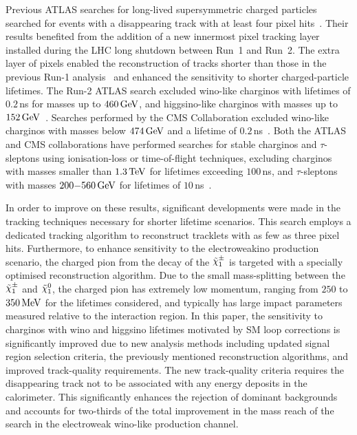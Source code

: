 Previous ATLAS searches for long-lived supersymmetric charged particles searched for events with a disappearing track with at least four pixel hits~\cite{SUSY-2018-19,SUSY-2016-06,ATL-PHYS-PUB-2017-019}. Their results benefited from the addition of a new innermost pixel tracking layer installed during the LHC long shutdown between Run~1 and Run~2. The extra layer of pixels enabled the reconstruction of tracks shorter than those in the previous Run-1 analysis~\cite{SUSY-2013-01} and enhanced the sensitivity to shorter charged-particle lifetimes. The Run-2 ATLAS search excluded wino-like charginos with lifetimes of $0.2\,$ns for masses up to $460\,\text{GeV}$, and higgsino-like charginos with masses up to $152\,\text{GeV}$~\cite{SUSY-2018-19}. Searches performed by the CMS Collaboration excluded wino-like charginos with masses below $474\,\text{GeV}$ and a lifetime of $0.2\,$ns~\cite{CMS-EXO-19-010}. 
Both the ATLAS and CMS collaborations have performed searches for stable charginos and $\tau$-sleptons using ionisation-loss or time-of-flight techniques, excluding charginos with masses smaller than $1.3\,\text{TeV}$ for lifetimes exceeding $100\,$ns, and $\tau$-sleptons with masses $200{-}560\,\text{GeV}$ for lifetimes of $10\,$ns~\cite{HMBS-2024-68,CMS-EXO-18-002}.

In order to improve on these results, significant developments were made in the tracking techniques necessary for shorter lifetime scenarios.
This search employs a dedicated tracking algorithm to reconstruct tracklets with as few as three pixel hits. 
Furthermore, to enhance sensitivity to the electroweakino production scenario, the charged pion from the decay of the $\chinoonepm$ is targeted with a specially optimised reconstruction algorithm.
Due to the small mass-splitting between the $\chinoonepm$ and $\ninoone$, the charged pion has extremely low momentum, ranging from $250$ to $350\,\text{MeV}$ for the \chinoonepm lifetimes considered, and typically has large impact parameters measured relative to the interaction region.
In this paper, the sensitivity to charginos with wino and higgsino lifetimes motivated by SM loop corrections is significantly improved due 
to new analysis methods including updated signal region selection criteria, the previously mentioned reconstruction algorithms, and improved track-quality requirements.
The new track-quality criteria requires the disappearing track not to be associated with any energy deposits in the calorimeter.
This significantly enhances the rejection of dominant backgrounds
and accounts for two-thirds of the total improvement in the mass reach of the search in the electroweak wino-like production channel.


